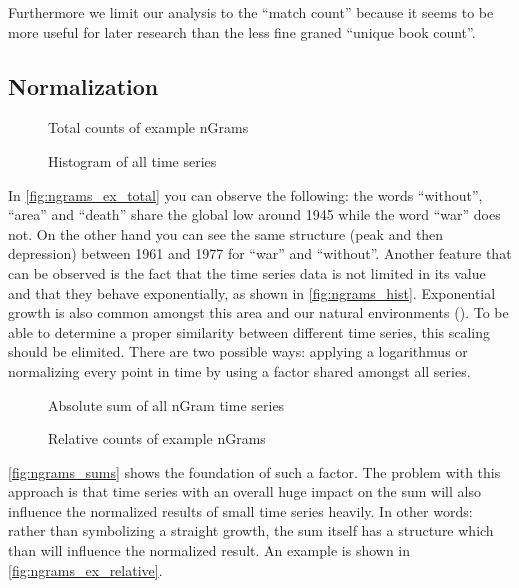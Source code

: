 Furthermore we limit our analysis to the \enquote{match count} because it seems to be more useful for later research than the less fine graned \enquote{unique book count}.


\subsection{Normalization}
\label{ssec:baseline:sim:norm}

\begin{figure}
    \centering
    
    \caption{Total counts of example nGrams}
    \label{fig:ngrams_ex_total}
\end{figure}

\begin{figure}
    \centering
    
    \caption{Histogram of all time series}
    \label{fig:ngrams_hist}
\end{figure}

In \autoref{fig:ngrams_ex_total} you can observe the following: the words \enquote{without}, \enquote{area} and \enquote{death} share the global low around 1945 while the word \enquote{war} does not. On the other hand you can see the same structure (peak and then depression) between 1961 and 1977 for \enquote{war} and \enquote{without}. Another feature that can be observed is the fact that the time series data is not limited in its value and that they behave exponentially, as shown in \autoref{fig:ngrams_hist}. Exponential growth is also common amongst this area and our natural environments (\cite{exp_growth1,exp_growth2}). To be able to determine a proper similarity between different time series, this scaling should be elimited. There are two possible ways: applying a logarithmus or normalizing every point in time by using a factor shared amongst all series.

\begin{figure}
    \centering
    
    \caption{Absolute sum of all nGram time series}
    \label{fig:ngrams_sums}
\end{figure}

\begin{figure}
    \centering
    
    \caption{Relative counts of example nGrams}
    \label{fig:ngrams_ex_relative}
\end{figure}

\autoref{fig:ngrams_sums} shows the foundation of such a factor. The problem with this approach is that time series with an overall huge impact on the sum will also influence the normalized results of small time series heavily. In other words: rather than symbolizing a straight growth, the sum itself has a structure which than will influence the normalized result. An example is shown in \autoref{fig:ngrams_ex_relative}.

